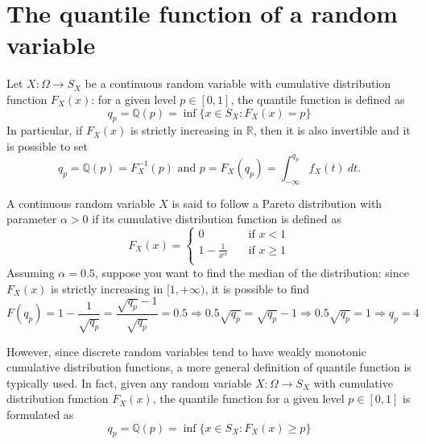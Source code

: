 \documentclass{report}
\begin{document}
\section{The quantile function of a random variable}
Let $\displaystyle X: \Omega \to S_X$ be a continuous random variable with cumulative distribution function $\displaystyle F_X(x)$: for a given level $\displaystyle p \in [0, 1]$, the quantile function is defined as
\[q_p = \mathbb{Q}(p) = \inf\{x \in S_X: F_X(x) = p\}\]
In particular, if $\displaystyle F_X(x)$ is strictly increasing in $\displaystyle \mathbb{R}$, then it is also invertible and it is possible to set
\[q_p = \mathbb{Q}(p) = F_X^{-1}(p) \text{ and } p = F_X(q_p) = \int_{-\infty}^{q_p} f_X(t) \ dt \text{.}\]
\begin{examplebox}
    A continuous random variable $\displaystyle X$ is said to follow a Pareto distribution with parameter $\displaystyle \alpha > 0$ if its cumulative distribution function is defined as
    \[F_X(x) = \begin{cases}
        0 &\quad\text{if $x < 1$} \\
        1 - \frac{1}{x^\alpha} &\quad\text{if $x \ge 1$} \\
    \end{cases}\]
    Assuming $\displaystyle \alpha = 0.5$, suppose you want to find the median of the distribution: since $\displaystyle F_X(x)$ is strictly increasing in $\displaystyle [1, +\infty)$, it is possible to find
    \[F(q_p) = 1 - \frac{1}{\sqrt{q_p}} = \frac{\sqrt{q_p} - 1}{\sqrt{q_p}} = 0.5 \Rightarrow 0.5\sqrt{q_p} = \sqrt{q_p} - 1 \Rightarrow 0.5\sqrt{q_p} = 1 \Rightarrow q_p = 4\]
\end{examplebox}
\noindent However, since discrete random variables tend to have weakly monotonic cumulative distribution functions, a more general definition of quantile function is typically used. \newline
In fact, given any random variable $\displaystyle X: \Omega \to S_X$ with cumulative distribution function $\displaystyle F_X(x)$, the quantile function for a given level $\displaystyle p \in [0, 1]$ is formulated as
\[q_p = \mathbb{Q}(p) = \inf\{x \in S_X : F_X(x) \ge p\}\]
\end{document}
